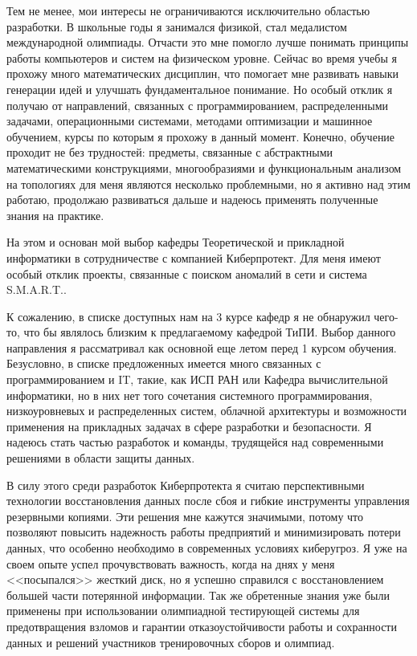 \quad Тем не менее, мои интересы не ограничиваются исключительно областью разработки. В школьные годы я занимался физикой, стал медалистом
международной олимпиады. Отчасти это мне помогло лучше понимать принципы работы компьютеров и систем на физическом уровне. Сейчас во время
учебы я прохожу много математических дисциплин, что помогает мне развивать навыки генерации идей и улучшать фундаментальное понимание. Но
особый отклик я получаю от направлений, связанных с программированием, распределенными задачами, операционными системами, методами оптимизации
и машинное обучением, курсы по которым я прохожу в данный момент. Конечно, обучение проходит не без трудностей: предметы, связанные с
абстрактными математическими конструкциями, многообразиями и функциональным анализом на топологиях для меня являются несколько проблемными, но
я активно над этим работаю, продолжаю развиваться дальше и надеюсь применять полученные знания на практике.

\quad На этом и основан мой выбор кафедры Теоретической и прикладной информатики в сотрудничестве с компанией Киберпротект. Для меня имеют
особый отклик проекты, связанные с поиском аномалий в сети и система S.M.A.R.T..

\quad К сожалению, в списке доступных нам на 3 курсе кафедр я не обнаружил чего-то, что бы являлось близким к предлагаемому кафедрой ТиПИ.
Выбор данного направления я рассматривал как основной еще летом перед 1 курсом обучения. Безусловно, в списке предложенных имеется много
связанных с программированием и IT, такие, как ИСП РАН или Кафедра вычислительной информатики, но в них нет того сочетания системного
программирования, низкоуровневых и распределенных систем, облачной архитектуры и возможности применения на прикладных задачах в сфере
разработки и безопасности. Я надеюсь стать частью разработок и команды, трудящейся над современными решениями в области защиты данных.

\quad В силу этого среди разработок Киберпротекта я считаю перспективными технологии восстановления данных после сбоя и гибкие инструменты
управления резервными копиями. Эти решения мне кажутся значимыми, потому что позволяют повысить надежность работы предприятий и минимизировать
потери данных, что особенно необходимо в современных условиях киберугроз. Я уже на своем опыте успел прочувствовать важность, когда на днях у
меня <<посыпался>> жесткий диск, но я успешно справился с восстановлением большей части потерянной информации. Так же обретенные знания уже 
были применены при использовании олимпиадной тестирующей системы для предотвращения взломов и гарантии отказоустойчивости работы и сохранности
данных и решений участников тренировочных сборов и олимпиад.

